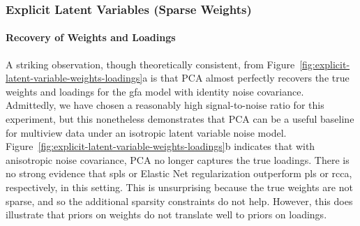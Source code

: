 \subsubsection{Explicit Latent Variables (Sparse Weights)}

\paragraph{Recovery of Weights and Loadings} A striking observation, though theoretically consistent, from Figure~\ref{fig:explicit-latent-variable-weights-loadings}a is that PCA almost perfectly recovers the true \gls{weights} and loadings for the \acrshort{gfa} model with identity noise covariance.
Admittedly, we have chosen a reasonably high signal-to-noise ratio for this experiment, but this nonetheless demonstrates that PCA can be a useful baseline for multiview data under an isotropic latent variable noise model.
Figure~\ref{fig:explicit-latent-variable-weights-loadings}b indicates that with anisotropic noise covariance, PCA no longer captures the true loadings.
There is no strong evidence that \acrshort{spls} or Elastic Net regularization outperform \acrshort{pls} or \acrshort{rcca}, respectively, in this setting.
This is unsurprising because the true \gls{weights} are not sparse, and so the additional sparsity constraints do not help.
However, this does illustrate that priors on \gls{weights} do not translate well to priors on loadings.


